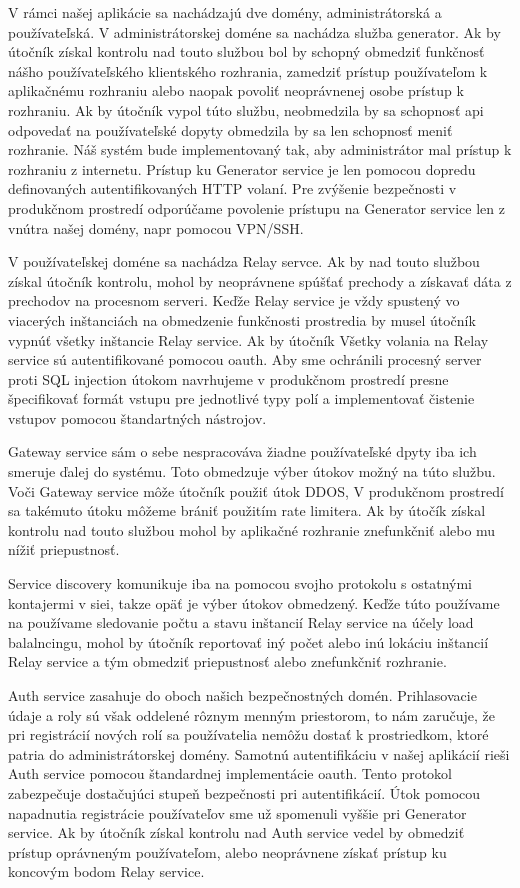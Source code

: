 V rámci našej aplikácie sa nachádzajú dve domény, administrátorská a používateľská. V administrátorskej doméne sa nachádza služba generator. Ak by útočník získal kontrolu nad touto službou bol by schopný obmedziť funkčnosť nášho používateľského klientského rozhrania, zamedziť prístup používateľom k aplikačnému rozhraniu alebo naopak povoliť neoprávnenej osobe prístup k rozhraniu. Ak by útočník vypol túto službu, neobmedzila by  sa schopnosť \acrshort{api} odpovedať na používateľské dopyty obmedzila  by sa len schopnosť meniť rozhranie. Náš systém bude implementovaný tak, aby administrátor mal prístup k rozhraniu z internetu. Prístup ku Generator service je len pomocou dopredu definovaných autentifikovaných HTTP volaní. Pre zvýšenie bezpečnosti v produkčnom prostredí odporúčame povolenie prístupu na Generator service len z vnútra našej domény, napr pomocou VPN/SSH.

V používateľskej doméne sa nachádza Relay servce. Ak by nad touto službou získal útočník kontrolu, mohol by neoprávnene spúšťať prechody a získavať dáta z prechodov na procesnom serveri. Keďže Relay service je vždy spustený vo viacerých inštanciách na obmedzenie funkčnosti prostredia by musel útočník vypnúť všetky inštancie Relay service. Ak by útočník Všetky volania na Relay service sú autentifikované pomocou \acrshort{oauth}.  Aby sme ochránili procesný server proti SQL injection útokom navrhujeme v produkčnom prostredí presne špecifikovať formát vstupu pre jednotlivé typy polí a  implementovať čistenie vstupov pomocou štandartných nástrojov.

Gateway service sám o sebe nespracováva žiadne používateľské dpyty iba ich smeruje ďalej do systému. Toto obmedzuje výber útokov možný na túto službu. Voči Gateway service môže útočník použiť útok DDOS, V produkčnom prostredí sa takémuto útoku môžeme brániť použitím rate limitera. Ak by útočík získal kontrolu nad touto službou mohol by aplikačné rozhranie znefunkčniť alebo mu nížiť priepustnosť.

Service discovery komunikuje iba na pomocou svojho protokolu s ostatnými kontajermi v siei, takze opäť je výber útokov obmedzený. Keďže túto používame na používame sledovanie počtu a stavu inštancií Relay service na účely load balalncingu, mohol by útočník reportovať iný počet alebo inú lokáciu inštancií Relay service a tým obmedziť priepustnosť alebo znefunkčniť rozhranie.

Auth service zasahuje do oboch našich bezpečnostných domén. Prihlasovacie údaje a roly sú však oddelené rôznym menným priestorom, to nám zaručuje, že pri registrácií nových rolí sa používatelia nemôžu dostať k prostriedkom, ktoré patria do administrátorskej domény. Samotnú
autentifikáciu v našej aplikácií rieši Auth service pomocou štandardnej implementácie \acrshort{oauth}. Tento protokol zabezpečuje dostačujúci stupeň bezpečnosti pri autentifikácií. Útok pomocou napadnutia registrácie používateľov sme už spomenuli vyššie pri Generator service. Ak by útočník získal kontrolu nad Auth service vedel by obmedziť prístup oprávneným používateľom, alebo neoprávnene získať prístup ku koncovým bodom Relay service.

